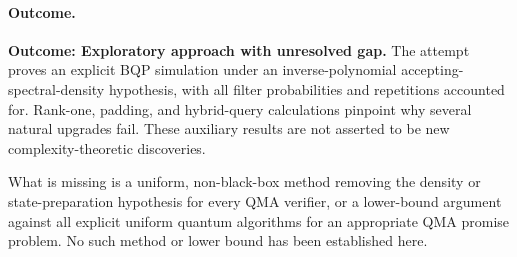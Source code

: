 \documentclass[11pt,a4paper]{article}
\numberwithin{equation}{section}
\begin{document}
\paragraph{Outcome.}
\textbf{Outcome: Exploratory approach with unresolved gap.}
The attempt proves an explicit BQP simulation under an inverse-polynomial
accepting-spectral-density hypothesis, with all filter probabilities and
repetitions accounted for. Rank-one, padding, and hybrid-query calculations
pinpoint why several natural upgrades fail. These auxiliary results are
not asserted to be new complexity-theoretic discoveries.

What is missing is a uniform, non-black-box method removing the density or
state-preparation hypothesis for every QMA verifier, or a lower-bound
argument against all explicit uniform quantum algorithms for an appropriate
QMA promise problem. No such method or lower bound has been established here.
\end{document}
